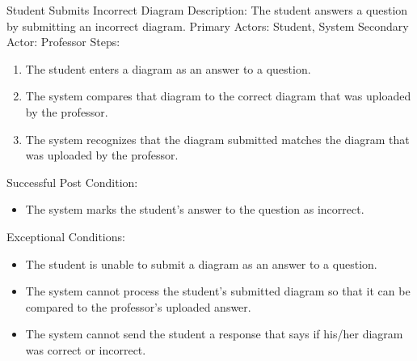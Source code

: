     \begin{section}{Student Submits Incorrect Diagram}
        Description: The student answers a question by submitting an incorrect diagram. \newline
        Primary Actors: Student, System \newline
        Secondary Actor: Professor \newline
        Steps:
        \begin{enumerate}
            \item{The student enters a diagram as an answer to a question.}
            \item{The system compares that diagram to the correct diagram that was uploaded by the professor.}
            \item{The system recognizes that the diagram submitted matches the diagram that was uploaded by the professor.}
        \end{enumerate}
        Successful Post Condition:
        \begin{itemize}
            \item{The system marks the student’s answer to the question as incorrect.}
        \end{itemize}
        Exceptional Conditions:
        \begin{itemize}
            \item{The student is unable to submit a diagram as an answer to a question.}
            \item{The system cannot process the student’s submitted diagram so that it can be compared to the professor’s uploaded answer.}
            \item{The system cannot send the student a response that says if his/her diagram was correct or incorrect.}
        \end{itemize}
    \end{section}


